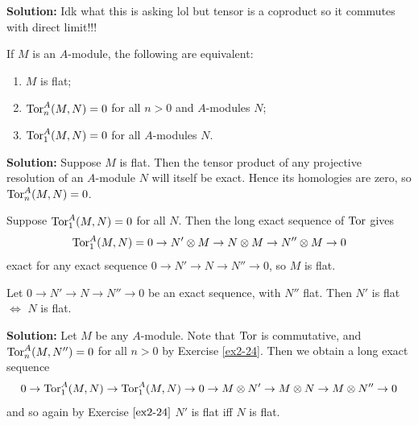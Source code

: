 \documentclass{article}
\begin{document}
\noindent\textbf{Solution:}
Idk what this is asking lol but tensor is a coproduct so it commutes with direct limit!!!

\begin{exercise} \label{ex2-24}
    If \(M\) is an \(A\)-module, the following are equivalent:
    \begin{enumerate}
        \item
            \(M\) is flat;
        \item
            \(\operatorname{Tor}_n^A(M, N) = 0\) for all \(n > 0\) and \(A\)-modules \(N\);
        \item
            \(\operatorname{Tor}_1^A(M, N) = 0\) for all \(A\)-modules \(N\).
    \end{enumerate}
\end{exercise}

\noindent\textbf{Solution:}
Suppose \(M\) is flat.
Then the tensor product of any projective resolution of an \(A\)-module \(N\) will itself be exact.
Hence its homologies are zero, so \(\operatorname{Tor}_n^A(M, N) = 0\).

Suppose \(\operatorname{Tor}_1^A(M, N) = 0\) for all \(N\).
Then the long exact sequence of \(\operatorname{Tor}\) gives
\[
    \operatorname{Tor}_1^A(M, N) = 0 \to N' \otimes M \to N \otimes M \to N'' \otimes M \to 0
\]
exact for any exact sequence \(0 \to N' \to N \to N'' \to 0\), so \(M\) is flat.

\begin{exercise}
    Let \(0 \to N' \to N \to N'' \to 0\) be an exact sequence, with \(N''\) flat.
    Then \(N'\) is flat \(\iff\) \(N\) is flat.
\end{exercise}

\noindent\textbf{Solution:}
Let \(M\) be any \(A\)-module.
Note that \(\operatorname{Tor}\) is commutative, and \(\operatorname{Tor}_n^A(M, N'') = 0\) for all \(n > 0\) by Exercise \ref{ex2-24}.
Then we obtain a long exact sequence
\[
    0 \to \operatorname{Tor}_1^A(M, N) \to \operatorname{Tor}_1^A(M, N) \to 0 \to M \otimes N' \to M \otimes N \to M \otimes N'' \to 0
\]
and so again by Exercise \(\ref{ex2-24}\) \(N'\) is flat iff \(N\) is flat.
\end{document}

